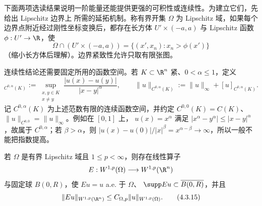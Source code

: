 下面两项选读结果说明一阶能量还能提供更强的可积性或连续性。为建立它们，先给出 Lipschitz 边界上
所需的延拓机制。称有界开集 $\Omega$ 为 Lipschitz 域，如果每个
边界点附近经过刚性坐标变换后，都存在长方体 $U'\times(-a,a)$ 与 Lipschitz 函数
$\phi:U'\to\R$，使
\[
 \Omega\cap(U'\times(-a,a))
 =\{(x',x_n):x_n>\phi(x')\}
\]
（缩小长方体后理解）。边界紧致性允许只取有限张图。

连续性结论还需要固定所用的函数空间。若 $K\subset\R^n$ 紧、$0<\alpha\le1$，定义
\begin{equation*}
 [u]_{C^{0,\alpha}(K)}
 :=\sup_{\substack{x,y\in K\\x\ne y}}
   \frac{|u(x)-u(y)|}{|x-y|^\alpha},
 \qquad
 \|u\|_{C^{0,\alpha}(K)}
 :=\|u\|_\infty+[u]_{C^{0,\alpha}(K)}.
\end{equation*}
记 $C^{0,\alpha}(K)$ 为上述范数有限的连续函数空间，并约定
$C^{0,0}(K)=C(K)$、$\|u\|_{C^{0,0}}=\|u\|_\infty$。例如在 $[0,1]$ 上，
$u(x)=x^\alpha$ 满足
$|x^\alpha-y^\alpha|\le|x-y|^\alpha$，故属于 $C^{0,\alpha}$；若
$\beta>\alpha$，则
$|u(x)-u(0)|/|x|^\beta=x^{\alpha-\beta}\to\infty$，所以一般不能把指数提高。

\begin{lemma}\label{lemma:4-3-3-lipschitz-extension}
若 $\Omega$ 是有界 Lipschitz 域且 $1\leq p<\infty$，则存在线性算子
\[
 E:W^{1,p}(\Omega)\longrightarrow W^{1,p}(\R^n)
\]
与固定球 $B(0,R)$，使 $Eu=u$ a.e. 于 $\Omega$、
$\supp Eu\subset\overline{B(0,R)}$，并且
\[
 \|Eu\|_{W^{1,p}(\R^n)}\leq C_{\Omega,p}\|u\|_{W^{1,p}(\Omega)}.
 \tag{4.3.15}\label{eq:4-3-extension-bound}
\]
\end{lemma}

